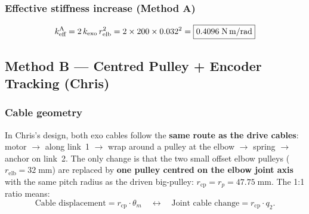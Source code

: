 \documentclass[11pt, a4paper]{article}
\begin{document}
\subsubsection{Effective stiffness increase (Method A)}
%
\begin{equation}\label{eq:keff_A}
    k_{\text{eff}}^{\text{A}} = 2\,k_{\text{exo}}\,r_{\text{elb}}^2
    = 2 \times 200 \times 0.032^2
    = \boxed{0.4096\;\text{N\,m/rad}}
\end{equation}

\subsection{Method B --- Centred Pulley + Encoder Tracking (Chris)}
\label{sec:methodB}

\subsubsection{Cable geometry}

In Chris's design, both exo cables follow the \textbf{same route as the
drive cables}: motor $\to$ along link~1 $\to$ wrap around a pulley at the
elbow $\to$ spring $\to$ anchor on link~2.  The only change is that the two
small offset elbow pulleys ($r_{\text{elb}} = 32\;\text{mm}$) are replaced
by \textbf{one pulley centred on the elbow joint axis} with the same pitch
radius as the driven big-pulley: $r_{\text{cp}} = r_p = 47.75\;\text{mm}$.
The 1:1 ratio means:
%
\begin{equation}
    \text{Cable displacement} = r_{\text{cp}} \cdot \theta_m
    \quad\leftrightarrow\quad
    \text{Joint cable change} = r_{\text{cp}} \cdot q_2.
\end{equation}
\end{document}

